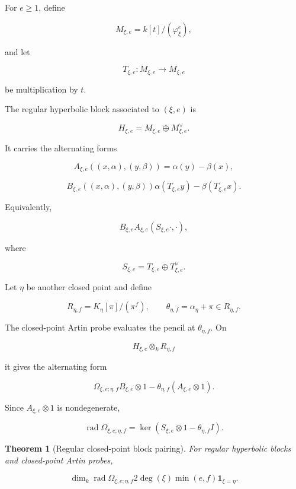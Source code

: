 \documentclass[11pt]{article}
\newtheorem{theorem}{Theorem}[section]
\begin{document}
For $e\ge1$, define

\[
M_{\xi,e}=k[t]/(\varphi_\xi^e),
\]

and let

\[
T_{\xi,e}:M_{\xi,e}\to M_{\xi,e}
\]

be multiplication by $t$.

The regular hyperbolic block associated to $(\xi,e)$ is

\[
H_{\xi,e}=M_{\xi,e}\oplus M_{\xi,e}^\vee.
\]

It carries the alternating forms

\[
A_{\xi,e}((x,\alpha),(y,\beta))
=
\alpha(y)-\beta(x),
\]

\[
B_{\xi,e}((x,\alpha),(y,\beta))
\alpha(T_{\xi,e}y)-\beta(T_{\xi,e}x).
\]

Equivalently,

\[
B_{\xi,e}
A_{\xi,e}(S_{\xi,e}\cdot,\cdot),
\]

where

\[
S_{\xi,e}=T_{\xi,e}\oplus T_{\xi,e}^\vee.
\]

Let $\eta$ be another closed point and define

\[
R_{\eta,f}=K_\eta[\pi]/(\pi^f),
\qquad
\theta_{\eta,f}=\alpha_\eta+\pi\in R_{\eta,f}.
\]

The closed-point Artin probe evaluates the pencil at $\theta_{\eta,f}$. On

\[
H_{\xi,e}\otimes_k R_{\eta,f}
\]

it gives the alternating form

\[
\Omega_{\xi,e;\eta,f}
B_{\xi,e}\otimes1-\theta_{\eta,f}(A_{\xi,e}\otimes1).
\]

Since $A_{\xi,e}\otimes1$ is nondegenerate,

\[
\operatorname{rad}\Omega_{\xi,e;\eta,f}
=
\ker(S_{\xi,e}\otimes1-\theta_{\eta,f}I).
\]

\begin{theorem}[Regular closed-point block pairing]

For regular hyperbolic blocks and closed-point Artin probes,

\[
\boxed{
\dim_k\operatorname{rad}\Omega_{\xi,e;\eta,f}
2\deg(\xi)\min(e,f)\mathbf 1_{\xi=\eta}.
}
\]

\end{theorem}
\end{document}
